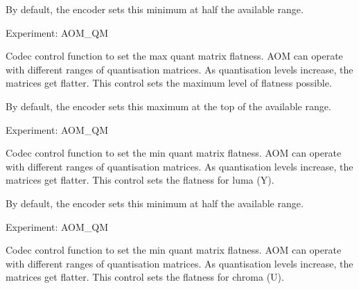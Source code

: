 \begin{Desc}
\begin{description}
By default, the encoder sets this minimum at half the available range.

Experiment\+: A\+O\+M\+\_\+\+QM \item[{\em 
A\+V1\+E\+\_\+\+S\+E\+T\+\_\+\+Q\+M\+\_\+\+M\+AX\hypertarget{group__aom__encoder_ggae78dde67a6d78f332e9bdba0dde42db5ad897674e1b68b24ec14a01a4e3edacc7}{}\label{group__aom__encoder_ggae78dde67a6d78f332e9bdba0dde42db5ad897674e1b68b24ec14a01a4e3edacc7}
}]Codec control function to set the max quant matrix flatness. A\+OM can operate with different ranges of quantisation matrices. As quantisation levels increase, the matrices get flatter. This control sets the maximum level of flatness possible.

By default, the encoder sets this maximum at the top of the available range.

Experiment\+: A\+O\+M\+\_\+\+QM \item[{\em 
A\+V1\+E\+\_\+\+S\+E\+T\+\_\+\+Q\+M\+\_\+Y\hypertarget{group__aom__encoder_ggae78dde67a6d78f332e9bdba0dde42db5a49c0eb54ab5a4d7d6cbc97d97f3029f8}{}\label{group__aom__encoder_ggae78dde67a6d78f332e9bdba0dde42db5a49c0eb54ab5a4d7d6cbc97d97f3029f8}
}]Codec control function to set the min quant matrix flatness. A\+OM can operate with different ranges of quantisation matrices. As quantisation levels increase, the matrices get flatter. This control sets the flatness for luma (Y).

By default, the encoder sets this minimum at half the available range.

Experiment\+: A\+O\+M\+\_\+\+QM \item[{\em 
A\+V1\+E\+\_\+\+S\+E\+T\+\_\+\+Q\+M\+\_\+U\hypertarget{group__aom__encoder_ggae78dde67a6d78f332e9bdba0dde42db5a5afff92787c68c2b5c50e3cfb9938504}{}\label{group__aom__encoder_ggae78dde67a6d78f332e9bdba0dde42db5a5afff92787c68c2b5c50e3cfb9938504}
}]Codec control function to set the min quant matrix flatness. A\+OM can operate with different ranges of quantisation matrices. As quantisation levels increase, the matrices get flatter. This control sets the flatness for chroma (U).


\end{description}
\end{Desc}
